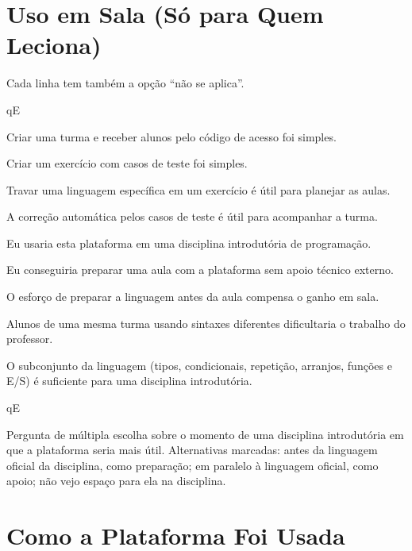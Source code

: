 \section{Uso em Sala (Só para Quem Leciona)}

Cada linha tem também a opção ``não se aplica''.

\begin{questoes}{qE}
    \item\label{qE:sala-ini} Criar uma turma e receber alunos pelo código de acesso foi simples.
    \item Criar um exercício com casos de teste foi simples.
    \item Travar uma linguagem específica em um exercício é útil para planejar as aulas.
    \item A correção automática pelos casos de teste é útil para acompanhar a turma.
    \item Eu usaria esta plataforma em uma disciplina introdutória de programação.
    \item Eu conseguiria preparar uma aula com a plataforma sem apoio técnico externo.
    \item O esforço de preparar a linguagem antes da aula compensa o ganho em sala.
    \item\label{qE:sala-risco} Alunos de uma mesma turma usando sintaxes diferentes dificultaria o trabalho do professor.
    \item O subconjunto da linguagem (tipos, condicionais, repetição, arranjos, funções e E/S) é suficiente para uma disciplina introdutória.
\end{questoes}

\begin{questoes}{qE}
    \item\label{qE:sala-fim} Pergunta de múltipla escolha sobre o momento de uma disciplina introdutória em que a plataforma seria mais útil. Alternativas marcadas: antes da linguagem oficial da disciplina, como preparação; em paralelo à linguagem oficial, como apoio; não vejo espaço para ela na disciplina.
\end{questoes}

\section{Como a Plataforma Foi Usada}

